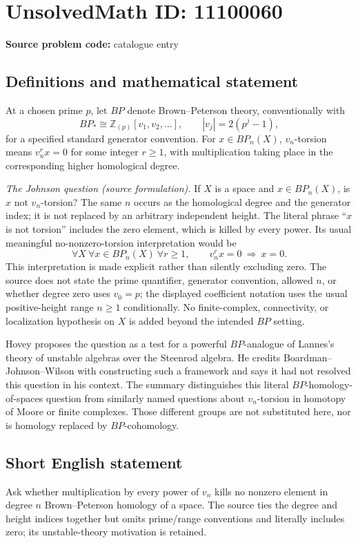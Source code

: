 \documentclass[11pt]{article}
\newcommand{\Z}{\mathbb{Z}}
\begin{document}
\section*{UnsolvedMath ID: 11100060}
\textbf{Source problem code:} catalogue entry
\subsection{Definitions and mathematical statement}
At a chosen prime \(p\), let \(BP\) denote Brown--Peterson theory, conventionally with
\[
 BP_*\cong\Z_{(p)}[v_1,v_2,\ldots],\qquad |v_j|=2(p^j-1),
\]
for a specified standard generator convention. For \(x\in BP_n(X)\), \(v_n\)-torsion means \(v_n^r x=0\) for some integer \(r\geq1\), with multiplication taking place in the corresponding higher homological degree.

\emph{The Johnson question (source formulation).} If \(X\) is a space and \(x\in BP_n(X)\), is \(x\) not \(v_n\)-torsion? The same \(n\) occurs as the homological degree and the generator index; it is not replaced by an arbitrary independent height. The literal phrase ``\(x\) is not torsion'' includes the zero element, which is killed by every power. Its usual meaningful no-nonzero-torsion interpretation would be
\[
 \forall X\ \forall x\in BP_n(X)\ \forall r\geq1,
 \qquad v_n^r x=0\ \Longrightarrow\ x=0.
\]
This interpretation is made explicit rather than silently excluding zero. The source does not state the prime quantifier, generator convention, allowed \(n\), or whether degree zero uses \(v_0=p\); the displayed coefficient notation uses the usual positive-height range \(n\geq1\) conditionally. No finite-complex, connectivity, or localization hypothesis on \(X\) is added beyond the intended \(BP\) setting.

Hovey proposes the question as a test for a powerful \(BP\)-analogue of Lannes's theory of unstable algebras over the Steenrod algebra. He credits Boardman--Johnson--Wilson with constructing such a framework and says it had not resolved this question in his context. The summary distinguishes this literal \(BP\)-homology-of-spaces question from similarly named questions about \(v_n\)-torsion in homotopy of Moore or finite complexes. Those different groups are not substituted here, nor is homology replaced by \(BP\)-cohomology.
\subsection{Short English statement}
Ask whether multiplication by every power of \(v_n\) kills no nonzero element in degree \(n\) Brown--Peterson homology of a space. The source ties the degree and height indices together but omits prime/range conventions and literally includes zero; its unstable-theory motivation is retained.
\end{document}
